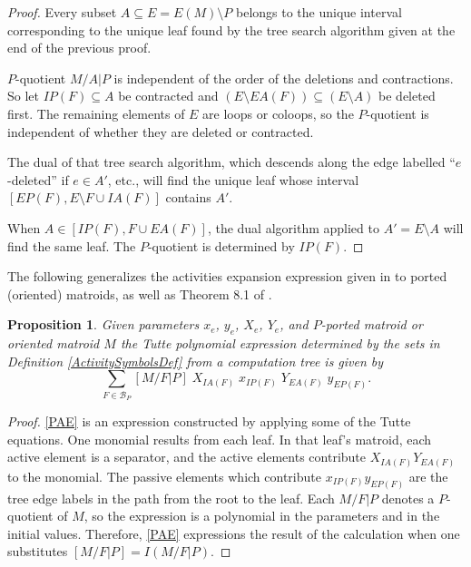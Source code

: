 \documentclass[12pt,leqno]{amsart}
\newtheorem{prop}[lem]{Proposition}
\theoremstyle{remark}
\begin{document}
\begin{proof}
Every subset $A\subseteq E=E(M)\setminus P$ belongs to the
unique interval corresponding to the unique leaf found by the tree search 
algorithm given at the end of the previous proof.  

$P$-quotient $M/A|P$ is independent of the order of the
deletions and contractions.  So let $IP(F)\subseteq A$ be contracted
and $(E\setminus EA(F))\subseteq (E\setminus A)$ be deleted first.
The remaining elements of $E$ are loops or coloops, so the $P$-quotient
is independent of whether they are deleted or contracted.

The dual of that tree search algorithm, which descends along
the edge labelled ``$e$-deleted'' if $e\in A'$, etc., will find the
unique leaf whose interval $[EP(F),E\setminus F\cup IA(F)]$ contains
$A'$.

When $A\in[IP(F),F\cup EA(F)]$, the dual algorithm applied to
$A'=E\setminus A$ will find the same leaf.  The $P$-quotient is
determined by $IP(F)$.
\end{proof}


The following generalizes the activities expansion expression given
in \cite{MR93a:05047} to ported (oriented) matroids, as well as 
Theorem 8.1 of \cite{SetPointedLV}. 

\begin{prop}
\label{TuttePolyExpression}
Given parameters $x_e$, $y_e$, $X_e$, $Y_e$, and 
$P$-ported matroid or oriented matroid $M$
the Tutte polynomial expression
determined by the sets in Definition 
\ref{ActivitySymbolsDef} 
from a computation tree is 
given by
\begin{equation}
\tag{PAE}
\label{PAE}
\sum_{F\in \mathcal{B}_P}[M/F|P]
\;X_{IA(F)}\;x_{IP(F)}\;Y_{EA(F)}\;y_{EP(F)}.
\end{equation}
\end{prop}

\begin{proof}
\eqref{PAE} is an expression constructed by applying some of the
Tutte equations.  One monomial results from each leaf.
In that leaf's matroid,
each active element is a separator, and the active elements
contribute $X_{IA(F)}Y_{EA(F)}$ to the monomial.
The passive elements which contribute
$x_{IP(F)}y_{EP(F)}$
are the tree
edge labels in the path from the root to the leaf.
Each $M/F|P$ denotes a $P$-quotient of $M$, so the
expression is a polynomial in the parameters and in the
initial values.  
Therefore, \eqref{PAE} expressions the result of
the calculation when one substitutes
$[M/F|P]=I(M/F|P)$.
\end{proof}
\end{document}

